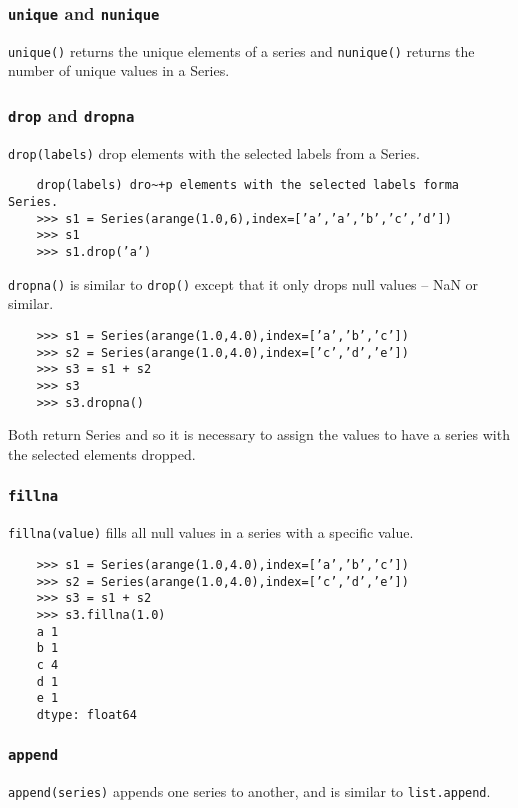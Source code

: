 \documentclass[KSmain.tex]{subfiles}
\begin{document}
	\subsubsection*{\texttt{unique} and \texttt{nunique}}
	\texttt{unique()} returns the unique elements of a series and \texttt{nunique()} returns the number of unique values in a
	Series.

\subsubsection*{\texttt{drop} and \texttt{dropna}}
\texttt{drop(labels)} drop elements with the selected labels from a Series.
\begin{framed}
	\begin{verbatim}
	drop(labels) dro~+p elements with the selected labels forma Series.
	>>> s1 = Series(arange(1.0,6),index=[’a’,’a’,’b’,’c’,’d’])
	>>> s1
	>>> s1.drop(’a’)
	\end{verbatim}
\end{framed}
	\texttt{dropna()} is similar to \texttt{drop()} except that it only drops null values – NaN or similar.
\begin{framed}
	\begin{verbatim}
	>>> s1 = Series(arange(1.0,4.0),index=[’a’,’b’,’c’])
	>>> s2 = Series(arange(1.0,4.0),index=[’c’,’d’,’e’])
	>>> s3 = s1 + s2
	>>> s3
	>>> s3.dropna()
	\end{verbatim}
\end{framed}
	Both return Series and so it is necessary to assign the values to have a series with the selected elements
	dropped.
\subsubsection*{\texttt{fillna}}
\texttt{fillna(value)} fills all null values in a series with a specific value.
\begin{framed}
\begin{verbatim}
	>>> s1 = Series(arange(1.0,4.0),index=[’a’,’b’,’c’])
	>>> s2 = Series(arange(1.0,4.0),index=[’c’,’d’,’e’])
	>>> s3 = s1 + s2
	>>> s3.fillna(1.0)
	a 1
	b 1
	c 4
	d 1
	e 1
	dtype: float64
\end{verbatim}
\end{framed}
\subsubsection*{\texttt{append}}
\texttt{append(series)} appends one series to another, and is similar to \texttt{list.append}.
\end{document}
